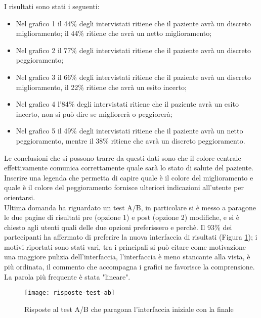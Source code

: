 I risultati sono stati i seguenti:
\begin{itemize}
    \item Nel grafico 1 il 44\% degli intervistati ritiene che il paziente avrà un discreto miglioramento; il 44\% ritiene che avrà un netto miglioramento;
    \item Nel grafico 2 il 77\% degli intervistati ritiene che il paziente avrà un discreto peggioramento;
    \item Nel grafico 3 il 66\% degli intervistati ritiene che il paziente avrà un discreto miglioramento, il 22\% ritiene che avrà un esito incerto;
    \item Nel grafico 4 l'84\% degli intervistati ritiene che il paziente avrà un esito incerto, non si può dire se migliorerà o peggiorerà;
    \item Nel grafico 5 il 49\% degli intervistati ritiene che il paziente avrà un netto peggioramento, mentre il 38\% ritiene che avrà un discreto peggioramento.
\end{itemize}
Le conclusioni che si possono trarre da questi dati sono che il colore centrale effettivamente comunica correttamente quale sarà lo stato di salute del paziente. Inserire una legenda che permetta di capire quale è il colore del miglioramento e quale è il colore del peggioramento fornisce ulteriori indicazioni all'utente per orientarsi. \\

Ultima domanda ha riguardato un test A/B, in particolare si è messo a paragone le due pagine di risultati pre (opzione 1) e post (opzione 2) modifiche, e si è chiesto agli utenti quali delle due opzioni preferissero e perchè. Il 93\% dei partecipanti ha affermato di preferire la nuova interfaccia di risultati (Figura \ref{fig:risposte-test-ab}); i motivi riportati sono stati vari, tra i principali si può citare come motivazione una maggiore pulizia dell'interfaccia, l'interfaccia è meno stancante alla vista, è più ordinata, il commento che accompagna i grafici ne favorisce la comprensione. La parola più frequente è stata "lineare". \\

\begin{figure}[!ht] 
    \centering 
    \texttt{[image: risposte-test-ab]}
    \caption{Risposte al test A/B che paragona l'interfaccia iniziale con la finale}
    \label{fig:risposte-test-ab}
\end{figure}

